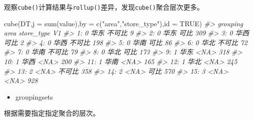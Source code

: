 \documentclass[
]{book}
\newenvironment{Shaded}{\begin{snugshade}}{\end{snugshade}}
\newcommand{\AttributeTok}[1]{\textcolor[rgb]{0.77,0.63,0.00}{#1}}
\newcommand{\CommentTok}[1]{\textcolor[rgb]{0.56,0.35,0.01}{\textit{#1}}}
\newcommand{\ConstantTok}[1]{\textcolor[rgb]{0.00,0.00,0.00}{#1}}
\newcommand{\FunctionTok}[1]{\textcolor[rgb]{0.00,0.00,0.00}{#1}}
\newcommand{\NormalTok}[1]{#1}
\newcommand{\StringTok}[1]{\textcolor[rgb]{0.31,0.60,0.02}{#1}}
\providecommand{\tightlist}{%
  \setlength{\itemsep}{0pt}\setlength{\parskip}{0pt}}
\begin{document}
观察\texttt{cube()}计算结果与\texttt{rollup()}差异，发现\texttt{cube()}聚合层次更多。

\begin{Shaded}
\begin{Highlighting}[]
\FunctionTok{cube}\NormalTok{(DT,}\AttributeTok{j =} \FunctionTok{sum}\NormalTok{(value),}\AttributeTok{by =} \FunctionTok{c}\NormalTok{(}\StringTok{"area"}\NormalTok{,}\StringTok{"store\_type"}\NormalTok{),}\AttributeTok{id =} \ConstantTok{TRUE}\NormalTok{)}
\CommentTok{\#\textgreater{}     grouping area store\_type  V1}
\CommentTok{\#\textgreater{}  1:        0 华东     不可比   9}
\CommentTok{\#\textgreater{}  2:        0 华东       可比 309}
\CommentTok{\#\textgreater{}  3:        0 华西       可比   2}
\CommentTok{\#\textgreater{}  4:        0 华西     不可比 198}
\CommentTok{\#\textgreater{}  5:        0 华南       可比  86}
\CommentTok{\#\textgreater{}  6:        0 华北     不可比  72}
\CommentTok{\#\textgreater{}  7:        0 华南     不可比  79}
\CommentTok{\#\textgreater{}  8:        0 华北       可比 173}
\CommentTok{\#\textgreater{}  9:        1 华东       \textless{}NA\textgreater{} 318}
\CommentTok{\#\textgreater{} 10:        1 华西       \textless{}NA\textgreater{} 200}
\CommentTok{\#\textgreater{} 11:        1 华南       \textless{}NA\textgreater{} 165}
\CommentTok{\#\textgreater{} 12:        1 华北       \textless{}NA\textgreater{} 245}
\CommentTok{\#\textgreater{} 13:        2 \textless{}NA\textgreater{}     不可比 358}
\CommentTok{\#\textgreater{} 14:        2 \textless{}NA\textgreater{}       可比 570}
\CommentTok{\#\textgreater{} 15:        3 \textless{}NA\textgreater{}       \textless{}NA\textgreater{} 928}
\end{Highlighting}
\end{Shaded}

\begin{itemize}
\tightlist
\item
  groupingsets
\end{itemize}

根据需要指定指定聚合的层次。
\end{document}
